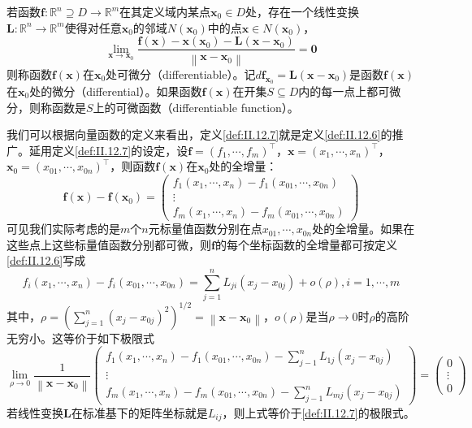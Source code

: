 \documentclass[main.tex]{subfiles}
\begin{document}
\begin{definition}\label{def:II.12.7}
若函数$\mathbf{f}:\mathbb{R}^n\supseteq D\rightarrow\mathbb{R}^m$在其定义域内某点$\mathbf{x}_0\in D$处，存在一个线性变换$\mathbf{L}:\mathbb{R}^n\rightarrow\mathbb{R}^m$使得对任意$\mathbf{x}_0$的邻域$N\left(\mathbf{x}_0\right)$中的点$\mathbf{x}\in N\left(\mathbf{x}_0\right)$，
\[\lim_{\mathbf{x}\rightarrow\mathbf{x}_0}\frac{\mathbf{f}\left(\mathbf{x}\right)-\mathbf{x}\left(\mathbf{x}_0\right)-\mathbf{L}\left(\mathbf{x}-\mathbf{x}_0\right)}{\left\|\mathbf{x}-\mathbf{x}_0\right\|}=\mathbf{0}\]
则称函数$\mathbf{f}\left(\mathbf{x}\right)$在$\mathbf{x}_0$处可微分（differentiable）。记$d\mathbf{f}_{\mathbf{x}_0}=\mathbf{L}\left(\mathbf{x}-\mathbf{x}_0\right)$是函数$\mathbf{f}\left(\mathbf{x}\right)$在$\mathbf{x}_0$处的微分（differential）。如果函数$\mathbf{f}\left(\mathbf{x}\right)$在开集$S\subseteq D$内的每一点上都可微分，则称函数是$S$上的可微函数（differentiable function）。
\end{definition}

我们可以根据向量函数的定义来看出，定义\ref{def:II.12.7}就是定义\ref{def:II.12.6}的推广。延用定义\ref{def:II.12.7}的设定，设$\mathbf{f}=\left(f_1,\cdots,f_m\right)^\intercal$，$\mathbf{x}=\left(x_1,\cdots,x_n\right)^\intercal$，$\mathbf{x}_0=\left(x_{01},\cdots,x_{0n}\right)^\intercal$，则函数$\mathbf{f}\left(\mathbf{x}\right)$在$\mathbf{x}_0$处的全增量：
\[
    \mathbf{f}\left(\mathbf{x}\right)-\mathbf{f}\left(\mathbf{x}_0\right)=\left(
    \begin{array}{c}
        f_1\left(x_1,\cdots,x_n\right)-f_1\left(x_{01},\cdots,x_{0n}\right)\\
    \vdots\\
    f_m\left(x_1,\cdots,x_n\right)-f_m\left(x_{01},\cdots,x_{0n}\right)
    \end{array}\right)
\]
可见我们实际考虑的是$m$个$n$元标量值函数分别在点$x_{01},\cdots,x_{0n}$处的全增量。如果在这些点上这些标量值函数分别都可微，则$\mathbf{f}$的每个坐标函数的全增量都可按定义\ref{def:II.12.6}写成
\[
f_i\left(x_1,\cdots,x_n\right)-f_i\left(x_{01},\cdots,x_{0n}\right)=\sum_{j=1}^n L_{ji}\left(x_j-x_{0j}\right)+o\left(\rho\right),i=1,\cdots,m
\]
其中，$\rho=\left(\sum_{j=1}^n\left(x_j-x_{0j}\right)^2\right)^{1/2}=\left\|\mathbf{x}-\mathbf{x}_0\right\|$，$o\left(\rho\right)$是当$\rho\to 0$时$\rho$的高阶无穷小。这等价于如下极限式
\[
\lim_{\rho\to 0}\frac{1}{\left\|\mathbf{x}-\mathbf{x}_0\right\|}\left(\begin{array}{c}
f_1\left(x_1,\cdots,x_n\right)-f_1\left(x_{01},\cdots,x_{0n}\right)-\sum_{j-1}^nL_{1j}\left(x_j-x_{0j}\right)\\
\vdots\\
f_m\left(x_1,\cdots,x_n\right)-f_m\left(x_{01},\cdots,x_{0n}\right)-\sum_{j-1}^nL_{mj}\left(x_j-x_{0j}\right)
\end{array}\right)=\left(\begin{array}{c}0\\\vdots\\0\end{array}\right)
\]
若线性变换$\mathbf{L}$在标准基下的矩阵坐标就是$L_{ij}$，则上式等价于\ref{def:II.12.7}的极限式。
\end{document}
